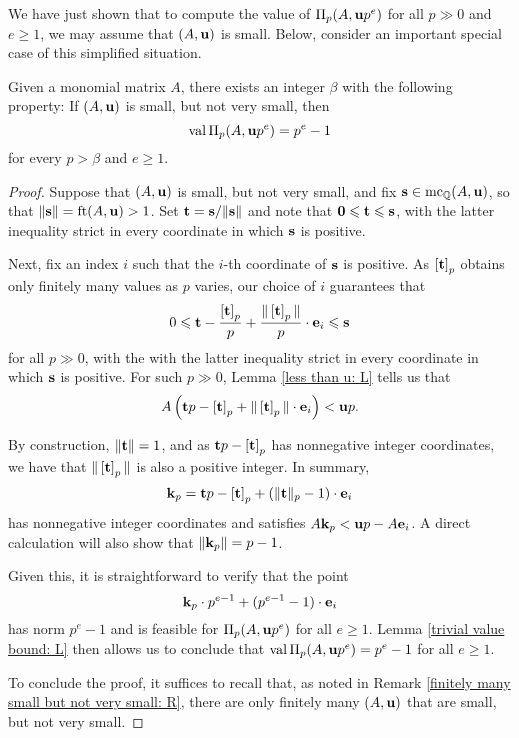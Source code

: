 \documentclass[11pt]{amsart}
\renewcommand{\!}[1]{{\color{red}\text{$\star$\,}#1\,$\star$}}
\begin{document}
We have just shown that to compute the value of $\Pi_p(A, \mathbf{u}p^e)$ for all $p \gg 0$ and $e \geq 1$, we may assume that $(A, \mathbf{u})$ is small.  Below, consider an important special case of this simplified situation.

\begin{theorem}
\label{trivial max value: T}  Given a monomial matrix $A$, there exists an integer $\beta$ with the following property:   
If $(A, \mathbf{u})$ is small, but not very small, then  \[ \operatorname{val} \Pi_p(A, \mathbf{u}p^e) = p^e-1\] for every $p > \beta$ and $e \geq 1$.
\end{theorem}

\begin{proof} Suppose that $(A, \mathbf{u})$ is small, but not very small, and fix $\mathbf{s} \in \operatorname{mc}_{\mathbb{Q}}(A, \mathbf{u})$, so that $\| \mathbf{s} \| = \operatorname{ft}(A, \mathbf{u}) > 1$.   
Set  $\mathbf{t} = \mathbf{s} / \| \mathbf{s} \|$ and note that $\mathbf{0} \leqslant \mathbf{t} \leqslant \mathbf{s}$, with the latter inequality strict in every coordinate in which $\mathbf{s}$ is positive.  

Next, fix an index $i$ such that the $i$-th coordinate of $\mathbf{s}$ is positive.  As $\left[ \mathbf{t} \right]_p$ obtains only finitely many values as $p$ varies, our choice of $i$ guarantees that 
\[ 0 \leqslant \mathbf{t} - \frac{\left[ \mathbf{t} \right]_p}{p} + \frac{\| \left[ \mathbf{t} \right]_p \|}{p} \cdot \mathbf{e}_i  \leqslant \mathbf{s} \]
for all $p \gg 0$, with the with the latter inequality strict in every coordinate in which $\mathbf{s}$ is positive.  For such $p \gg 0$,  Lemma \ref{less than u: L} tells us that 
%
 \[ A \left(  \mathbf{t}p - \left[ \mathbf{t} \right]_p + \| \left[ \mathbf{t} \right]_p \| \cdot \mathbf{e}_i  \right) < \mathbf{u}p. \]
%
 
 By construction, $\| \mathbf{t} \| = 1$, and as $\mathbf{t}p - \left[ \mathbf{t} \right]_p$ has nonnegative integer coordinates, we have that $\| \left[ \mathbf{t} \right]_p \|$ is also a positive integer.  In summary, 
  \[ \mathbf{k}_p  =   \mathbf{t}p - \left[ \mathbf{t} \right]_p+ (\| \mathbf{t} \|_p - 1) \cdot \mathbf{e}_i   \] has nonnegative integer coordinates and satisfies $A \mathbf{k}_p < \mathbf{u}p - A \mathbf{e}_i$.  A direct calculation will also show that $\| \mathbf{k}_p \| = p-1$. 
  
 Given this, it is straightforward to verify that the point
 \[ \mathbf{k}_p \cdot p^{e-1} + (p^{e-1} - 1) \cdot \mathbf{e}_i \]
 has norm $p^e-1$ and is feasible for $\Pi_p(A, \mathbf{u}p^e)$ for all $e \geq 1$.  Lemma \ref{trivial value bound: L} then allows us to conclude that $\operatorname{val} \Pi_p(A, \mathbf{u}p^e)  = p^e-1$ for all $e \geq 1$.
 
To conclude the proof, it suffices to recall that, as noted in Remark \ref{finitely many small but not very small: R},  there are only finitely many $(A, \mathbf{u})$ that are small, but not very small.
\end{proof}
\end{document}
